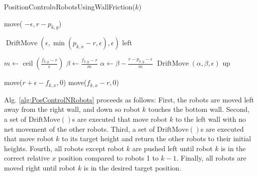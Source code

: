 \begin{algorithm}
\caption{PositionControl$n$RobotsUsingWallFriction($k$)}\label{alg:PosControlNRobots}
\begin{algorithmic}[1]
\State move( $-\epsilon, r-p_{k,y}$) %


\State $\operatorname{DriftMove}(\epsilon, \min(p_{k,x} - r,\epsilon), \epsilon)$ left   %
\EndWhile

\State $m \gets \operatorname{ceil}(\frac{f_{k,y}-r}{\epsilon})$
\State $\beta \gets \frac{f_{k,y}-r}{m}$
\State $\alpha \gets \beta - \frac{r - p_{k,y}-\epsilon}{m}$
\State $\operatorname{DriftMove}(\alpha, \beta, \epsilon)$ up   %
\EndFor

\State move($r+\epsilon-f_{k,x}, 0$)  %
\State move($f_{k,x}-r, 0$)  

\end{algorithmic}
\end{algorithm}

Alg. \ref{alg:PosControlNRobots} proceeds as follows:  
First, the robots are moved left away from the right wall, and down so robot $k$ touches the bottom wall.
Second, a set of $\operatorname{DriftMove()}$s are executed that move robot $k$ to the left wall with no net movement of the other robots.
Third, a set of $\operatorname{DriftMove()}$s are executed that  move robot $k$ to its target height and return the other robots to their initial heights. 
Fourth, all robots except robot $k$ are pushed left until robot $k$ is in the correct relative $x$ position compared to robots 1 to $k-1$.
Finally, all robots are moved right until robot $k$ is in the desired target position.



